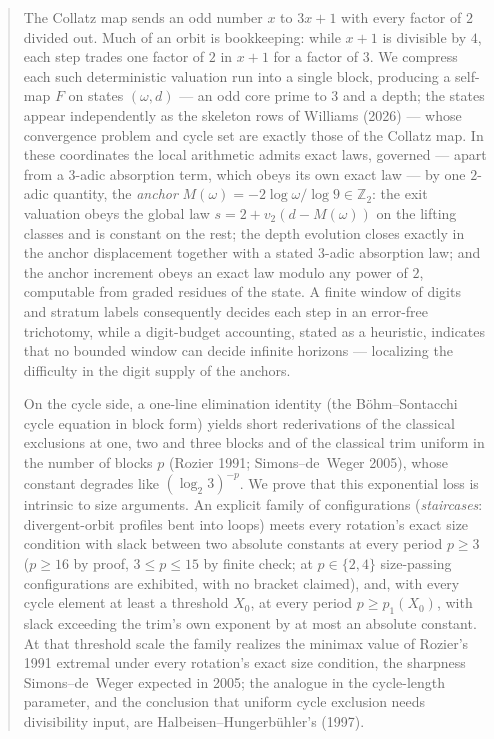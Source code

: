 \documentclass[11pt]{article}
\theoremstyle{remark}
\newcommand{\Z}{\mathbb{Z}}
\newcommand{\vt}[1]{v_2\!\left(#1\right)}
\newcommand{\w}{\omega}
\newcommand{\LL}{\log_2 3}
\begin{document}
\begin{quote}\small
The Collatz map sends an odd number $x$ to $3x+1$ with every factor of $2$ divided out. Much of an orbit is bookkeeping: while $x+1$ is divisible by $4$, each step trades one factor of $2$ in $x+1$ for a factor of $3$. We compress each such deterministic valuation run into a single block, producing a self-map $F$ on states $(\w,d)$ --- an odd core prime to $3$ and a depth; the states appear independently as the skeleton rows of Williams (2026) --- whose convergence problem and cycle set are exactly those of the Collatz map. In these coordinates the local arithmetic admits exact laws, governed --- apart from a $3$-adic absorption term, which obeys its own exact law --- by one $2$-adic quantity, the \emph{anchor} $M(\w) = -2\log\w/\log 9 \in \Z_2$: the exit valuation obeys the global law $s = 2 + \vt{d - M(\w)}$ on the lifting classes and is constant on the rest; the depth evolution closes exactly in the anchor displacement together with a stated $3$-adic absorption law; and the anchor increment obeys an exact law modulo any power of $2$, computable from graded residues of the state. A finite window of digits and stratum labels consequently decides each step in an error-free trichotomy, while a digit-budget accounting, stated as a heuristic, indicates that no bounded window can decide infinite horizons --- localizing the difficulty in the digit supply of the anchors.

On the cycle side, a one-line elimination identity (the B\"ohm--Sontacchi cycle equation in block form) yields short rederivations of the classical exclusions at one, two and three blocks and of the classical trim uniform in the number of blocks $p$ (Rozier 1991; Simons--de~Weger 2005), whose constant degrades like $(\LL)^{-p}$. We prove that this exponential loss is intrinsic to size arguments. An explicit family of configurations (\emph{staircases}: divergent-orbit profiles bent into loops) meets every rotation's exact size condition with slack between two absolute constants at every period $p \ge 3$ ($p \ge 16$ by proof, $3 \le p \le 15$ by finite check; at $p \in \{2,4\}$ size-passing configurations are exhibited, with no bracket claimed), and, with every cycle element at least a threshold $X_0$, at every period $p \ge p_1(X_0)$, with slack exceeding the trim's own exponent by at most an absolute constant. At that threshold scale the family realizes the minimax value of Rozier's 1991 extremal under every rotation's exact size condition, the sharpness Simons--de~Weger expected in 2005; the analogue in the cycle-length parameter, and the conclusion that uniform cycle exclusion needs divisibility input, are Halbeisen--Hungerb\"uhler's (1997).


\end{quote}
\end{document}
